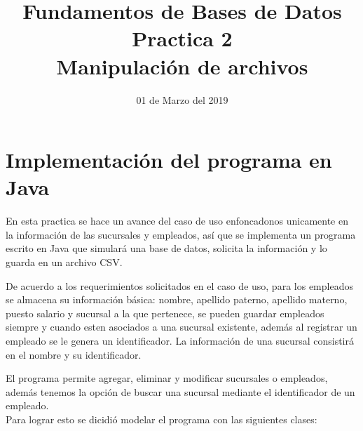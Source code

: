 \documentclass[10pt]{article}
\begin{document}
    \title{Fundamentos de Bases de Datos \\
        Practica 2\\ Manipulación de archivos
        } 
    \author{}
    \date{01 de Marzo del 2019}
    \maketitle
    
    \section{Implementación del programa en Java}\vspace{0.5cm}
    En esta practica se hace un avance del caso de uso enfoncadonos unicamente en la información de las sucursales y empleados, así que se implementa  un programa escrito en Java que simulará una base de datos, solicita la información y lo guarda en un archivo CSV.
    
    De acuerdo a los requerimientos solicitados en el caso de uso, para los empleados se almacena su información básica: nombre, apellido paterno, apellido materno, puesto salario y sucursal a la que pertenece, se pueden guardar empleados siempre y cuando esten asociados a una sucursal existente, además al registrar un empleado se le genera  un identificador. La información de una sucursal consistirá en el nombre y su identificador.
    
    El programa permite agregar, eliminar y modificar sucursales o empleados, además tenemos
    la opción de buscar una sucursal mediante el identificador de un empleado.\\
    
    
    Para lograr esto se dicidió modelar el programa con las siguientes clases:
    
\end{document}

